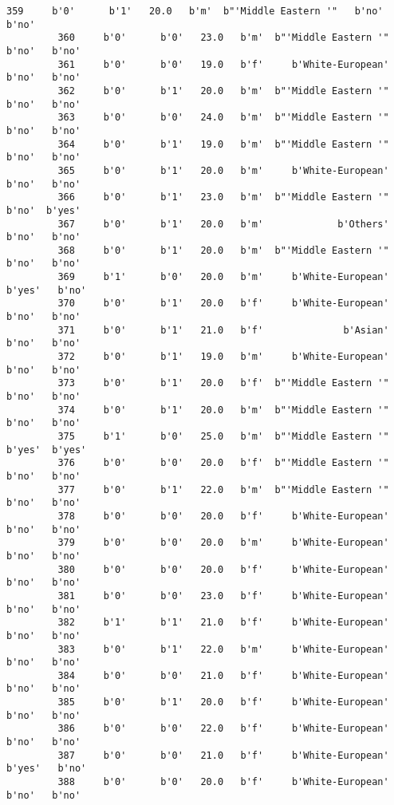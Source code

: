 \documentclass[11pt]{article}
\begin{document}
\begin{Verbatim}[commandchars=\\\{\}]
         359     b'0'      b'1'   20.0   b'm'  b"'Middle Eastern '"   b'no'   b'no'   
         360     b'0'      b'0'   23.0   b'm'  b"'Middle Eastern '"   b'no'   b'no'   
         361     b'0'      b'0'   19.0   b'f'     b'White-European'   b'no'   b'no'   
         362     b'0'      b'1'   20.0   b'm'  b"'Middle Eastern '"   b'no'   b'no'   
         363     b'0'      b'0'   24.0   b'm'  b"'Middle Eastern '"   b'no'   b'no'   
         364     b'0'      b'1'   19.0   b'm'  b"'Middle Eastern '"   b'no'   b'no'   
         365     b'0'      b'1'   20.0   b'm'     b'White-European'   b'no'   b'no'   
         366     b'0'      b'1'   23.0   b'm'  b"'Middle Eastern '"   b'no'  b'yes'   
         367     b'0'      b'1'   20.0   b'm'             b'Others'   b'no'   b'no'   
         368     b'0'      b'1'   20.0   b'm'  b"'Middle Eastern '"   b'no'   b'no'   
         369     b'1'      b'0'   20.0   b'm'     b'White-European'  b'yes'   b'no'   
         370     b'0'      b'1'   20.0   b'f'     b'White-European'   b'no'   b'no'   
         371     b'0'      b'1'   21.0   b'f'              b'Asian'   b'no'   b'no'   
         372     b'0'      b'1'   19.0   b'm'     b'White-European'   b'no'   b'no'   
         373     b'0'      b'1'   20.0   b'f'  b"'Middle Eastern '"   b'no'   b'no'   
         374     b'0'      b'1'   20.0   b'm'  b"'Middle Eastern '"   b'no'   b'no'   
         375     b'1'      b'0'   25.0   b'm'  b"'Middle Eastern '"  b'yes'  b'yes'   
         376     b'0'      b'0'   20.0   b'f'  b"'Middle Eastern '"   b'no'   b'no'   
         377     b'0'      b'1'   22.0   b'm'  b"'Middle Eastern '"   b'no'   b'no'   
         378     b'0'      b'0'   20.0   b'f'     b'White-European'   b'no'   b'no'   
         379     b'0'      b'0'   20.0   b'm'     b'White-European'   b'no'   b'no'   
         380     b'0'      b'0'   20.0   b'f'     b'White-European'   b'no'   b'no'   
         381     b'0'      b'0'   23.0   b'f'     b'White-European'   b'no'   b'no'   
         382     b'1'      b'1'   21.0   b'f'     b'White-European'   b'no'   b'no'   
         383     b'0'      b'1'   22.0   b'm'     b'White-European'   b'no'   b'no'   
         384     b'0'      b'0'   21.0   b'f'     b'White-European'   b'no'   b'no'   
         385     b'0'      b'1'   20.0   b'f'     b'White-European'   b'no'   b'no'   
         386     b'0'      b'0'   22.0   b'f'     b'White-European'   b'no'   b'no'   
         387     b'0'      b'0'   21.0   b'f'     b'White-European'  b'yes'   b'no'   
         388     b'0'      b'0'   20.0   b'f'     b'White-European'   b'no'   b'no'   

\end{Verbatim}
\end{document}
